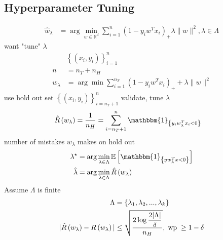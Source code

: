 \documentclass{article}
\begin{document}
\subsection{Hyperparameter Tuning}
\begin{align*}
\hat{w}_{\lambda} &= \arg\displaystyle\min_{w \in \mathbb{R}^{d}} \displaystyle\sum_{i=1}^{n} \left(1 - y_{i} w^{T} x_{i}\right)_{+} \lambda \| w \|^{2}, \lambda \in \Lambda
\end{align*}
want "tune" $\lambda$
\begin{align*}
&\left\{\left(x_{i}, y_{i}\right)\right\}_{i=1}^{n}
\\ n &= n_{T} + n_{H}
\\ w_{\lambda} &= \arg\displaystyle\min \displaystyle\sum_{i=1}^{n_{T}} \left(1 - y_{i} w^{T} x_{i}\right)_{+} + \lambda \| w \|^{2}
\end{align*}
use hold out set $\left\{\left(x_{i}, y_{i}\right)\right\}_{i = n_{T} + 1}^{n}$ validate, tune $\lambda$
\begin{align*}
\hat{R}\left(w_{\lambda}\right) &= \dfrac{1}{n_{H}} = \displaystyle\sum_{i = n_{T} + 1}^{n} \mathbbm{1}_{\left\{y_{i} w^{T}_{\lambda} x_{i} < 0\right\}}
\end{align*}
number of mistakes $w_{\lambda}$ makes on hold out
\begin{align*}
\lambda^\star  &= \arg\displaystyle\min_{\lambda \in \Lambda} \mathbb{E}\left[\mathbbm{1}_{\left\{y w_{\lambda}^{T} x < 0\right\}}\right]
\\ \hat{\lambda} &= \arg\displaystyle\min_{\lambda \in \Lambda} \hat{R}\left(w_{\lambda}\right)
\end{align*}
Assume $\Lambda$ is finite
\begin{align*}
\Lambda &= \left\{\lambda_{1}, \lambda_{2}, ..., \lambda_{k}\right\}
\\ | \hat{R}\left(w_{\lambda}\right) - R\left(w_{\lambda}\right) | &\leq  \sqrt{\dfrac{2 \log \dfrac{2 | \Lambda |}{\delta}}{n_{H}}}, \text{\;wp\;} \geq  1 - \delta
\end{align*}
\end{document}
